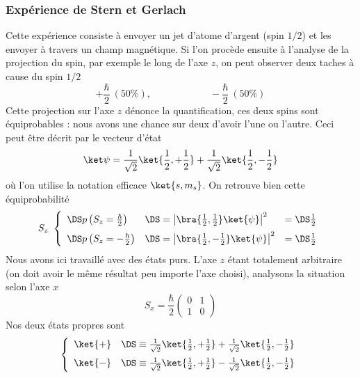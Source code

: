 \subsubsection{Expérience de Stern et Gerlach}
Cette expérience consiste à envoyer un jet d'atome d'argent (spin $1/2$) et les 
envoyer à travers un champ magnétique. Si l'on procède ensuite à l'analyse de 
la projection du spin, par exemple le long de l'axe $z$, on peut observer deux 
taches à cause du spin $1/2$
\begin{equation}
+\frac{\hbar}{2}\ (50\%),\qquad\qquad\qquad -\frac{\hbar}{2}\ (50\%)
\end{equation}
Cette projection sur l'axe $z$ dénonce la quantification, ces deux spins sont 
équiprobables : nous avons une chance sur deux d'avoir l'une ou l'autre. Ceci 
peut être décrit par le vecteur d'état
\begin{equation}
\ket \psi = \frac{1}{\sqrt{2}}\ket{\frac{1}{2},+\frac{1}{2}}+\frac{1}{\sqrt{2}}\ket{\frac{1}{2},-\frac{1}{2}}
\end{equation}
où l'on utilise la notation efficace $\ket{s,m_s}$.  On retrouve bien cette 
équiprobabilité
\begin{equation}
S_z\ \left\{\begin{array}{lll}
\DS p\left(S_z = \frac{\hbar}{2}\right) &\DS= \left| \bra{\frac{1}{2},\frac{1}{2}}\ket{\psi}\right|^2&=\DS\frac{1}{2}\vspace{2mm}\\
\DS p\left(S_z = -\frac{\hbar}{2}\right) &\DS= \left| \bra{\frac{1}{2},-\frac{1}{2}}\ket{\psi}\right|^2&=\DS\frac{1}{2}
\end{array}\right.
\end{equation}
Nous avons ici travaillé avec des états purs. L'axe $z$ étant totalement arbitraire 
(on doit avoir le même résultat peu importe l'axe choisi), analysons la situation 
selon l'axe $x$
\begin{equation}
S_x = \frac{\hbar}{2}\left(\begin{array}{cc}
0&1\\
1&0
\end{array}\right)
\end{equation}
Nos deux états propres sont
\begin{equation}
\left\{\begin{array}{ll}
\ket{+} &\DS\equiv \frac{1}{\sqrt{2}}\ket{\frac{1}{2},+\frac{1}{2}}+\frac{1}{\sqrt{2}}\ket{\frac{1}{2},-\frac{1}{2}}\vspace{2mm}\\
\ket{-} &\DS\equiv \frac{1}{\sqrt{2}}\ket{\frac{1}{2},+\frac{1}{2}}-\frac{1}{\sqrt{2}}\ket{\frac{1}{2},-\frac{1}{2}}
\end{array}\right.
\end{equation}

